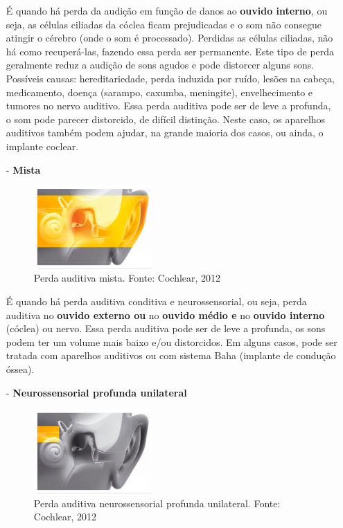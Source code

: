 \documentclass[brasil]{abnt}
\begin{document}
\begin{itemize}
						É quando há perda da audição em função de danos ao \textbf{ouvido interno}, ou seja, as células ciliadas da cóclea ficam prejudicadas e o som não consegue atingir o cérebro (onde o som é processado). 
						Perdidas as células ciliadas, não há como recuperá-las,	fazendo essa perda ser permanente. Este tipo de perda geralmente reduz a audição de sons agudos e pode distorcer alguns sons. Possíveis causas:
						hereditariedade, perda induzida por ruído, lesões na cabeça, medicamento, doença (sarampo, caxumba, meningite), envelhecimento e tumores no nervo auditivo. Essa perda auditiva pode ser de leve a profunda,
						o som pode parecer distorcido, de difícil distinção. Neste caso, os aparelhos auditivos também podem ajudar, na grande maioria dos casos, ou ainda, o implante coclear. 
					
					\item [-] \textbf{Mista} 
						\begin{figure}[!htb]
							\center
							\includegraphics[width=45mm]{pam.png}
							\caption{Perda auditiva mista. Fonte: Cochlear, 2012}
						\end{figure}
						
						É quando há perda auditiva conditiva e neurossensorial, ou seja, perda auditiva no \textbf{ouvido externo ou} no \textbf{ouvido médio e} no \textbf{ouvido interno} (cóclea) ou nervo. Essa perda auditiva pode ser de leve a profunda, 
						os sons podem ter um volume mais baixo e/ou distorcidos. Em alguns casos, pode ser tratada com aparelhos auditivos ou com sistema Baha (implante de condução óssea).
					
					\item [-] \textbf{Neurossensorial profunda unilateral} 
						\begin{figure}[!htb]
							\center
							\includegraphics[width=45mm]{panp.png}
							\caption{Perda auditiva neurossensorial profunda unilateral. Fonte: Cochlear, 2012}
						\end{figure}
						

\end{itemize}
\end{document}
